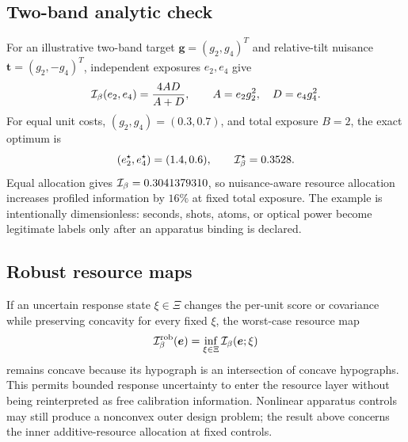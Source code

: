 \subsection{Two-band analytic check}

For an illustrative two-band target $\bm g=(g_2,g_4)^T$ and relative-tilt nuisance $\bm t=(g_2,-g_4)^T$, independent exposures $e_2,e_4$ give
\begin{equation}
\mathcal I_{\beta}(e_2,e_4)=\frac{4AD}{A+D},\qquad
A=e_2g_2^2,\quad D=e_4g_4^2.
\label{eq:twoband}
\end{equation}
For equal unit costs, $(g_2,g_4)=(0.3,0.7)$, and total exposure $B=2$, the exact optimum is
\begin{equation}
(e_2^\star,e_4^\star)=(1.4,0.6),\qquad
\mathcal I_{\beta}^\star=0.3528.
\end{equation}
Equal allocation gives $\mathcal I_{\beta}=0.3041379310$, so nuisance-aware resource allocation increases profiled information by $16\%$ at fixed total exposure. The example is intentionally dimensionless: seconds, shots, atoms, or optical power become legitimate labels only after an apparatus binding is declared.

\subsection{Robust resource maps}

If an uncertain response state $\xi\in\Xi$ changes the per-unit score or covariance while preserving concavity for every fixed $\xi$, the worst-case resource map
\begin{equation}
\mathcal I_{\beta}^{\rm rob}(\bm e)=\inf_{\xi\in\Xi}\mathcal I_{\beta}(\bm e;\xi)
\end{equation}
remains concave because its hypograph is an intersection of concave hypographs. This permits bounded response uncertainty to enter the resource layer without being reinterpreted as free calibration information. Nonlinear apparatus controls may still produce a nonconvex outer design problem; the result above concerns the inner additive-resource allocation at fixed controls.
